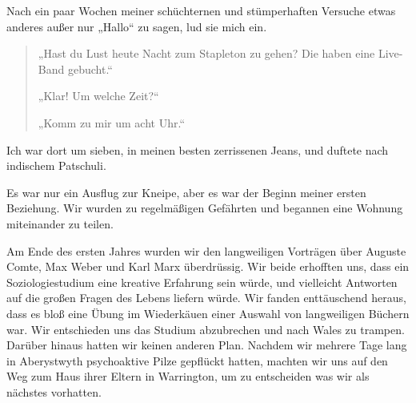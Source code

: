 \documentclass[12pt]{memoir}
\begin{document}
Nach ein paar Wochen meiner schüchternen und stümperhaften Versuche
etwas anderes außer nur „Hallo“ zu sagen, lud sie mich ein.

\begin{quote}
„Hast du Lust heute Nacht zum Stapleton zu gehen?
Die haben eine Live-Band gebucht.“

„Klar! Um welche Zeit?“

„Komm zu mir um acht Uhr.“
\end{quote}

Ich war dort um sieben, in meinen besten zerrissenen Jeans,
und duftete nach indischem Patschuli.

Es war nur ein Ausflug zur Kneipe,
aber es war der Beginn meiner ersten Beziehung.
Wir wurden zu regelmäßigen Gefährten
und begannen eine Wohnung miteinander zu teilen.

Am Ende des ersten Jahres wurden wir den langweiligen Vorträgen über
Auguste Comte, Max Weber und Karl Marx überdrüssig.
Wir beide erhofften uns, dass ein Soziologiestudium
eine kreative Erfahrung sein würde,
und vielleicht Antworten auf die großen Fragen des Lebens liefern würde.
Wir fanden enttäuschend heraus, dass es bloß eine Übung im Wiederkäuen
einer Auswahl von langweiligen Büchern war.
Wir entschieden uns das Studium abzubrechen und nach Wales zu trampen.
Darüber hinaus hatten wir keinen anderen Plan.
Nachdem wir mehrere Tage lang in Aberystwyth
psychoaktive Pilze gepflückt hatten,
machten wir uns auf den Weg zum Haus ihrer Eltern in Warrington,
um zu entscheiden was wir als nächstes vorhatten.
\end{document}
